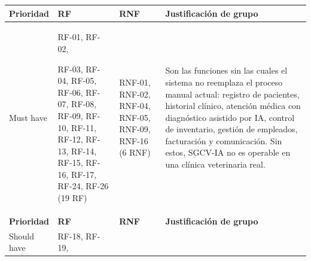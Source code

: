 \documentclass[
]{article}
\newcounter{none} %
\begin{document}
{\def\LTcaptype{none} %
\begin{longtable}[]{@{}
  >{\centering\arraybackslash}p{}
  >{\raggedright\arraybackslash}p{}
  >{\raggedright\arraybackslash}p{}
  >{\raggedright\arraybackslash}p{}@{}}
\toprule\noalign{}
\begin{minipage}[b]{\linewidth}\centering
\textbf{Prioridad}
\end{minipage} & \begin{minipage}[b]{\linewidth}\centering
\textbf{RF}
\end{minipage} & \begin{minipage}[b]{\linewidth}\centering
\textbf{RNF}
\end{minipage} & \begin{minipage}[b]{\linewidth}\centering
\textbf{Justificación de grupo}
\end{minipage} \\
\midrule\noalign{}
\endhead
\bottomrule\noalign{}
\endlastfoot
Must have & RF-01, RF-02,

RF-03, RF-04, RF-05, RF-06, RF-07, RF-08, RF-09, RF-10, RF-11, RF-12, RF-13, RF-14, RF-15, RF-16, RF-17, RF-24, RF-26 (19 RF) &
\begin{minipage}[t]{\linewidth}\raggedright
RNF-01, RNF-02, RNF-04, RNF-05, RNF-09, RNF-16 (6 RNF)
\end{minipage} & Son las funciones sin las cuales el sistema no
reemplaza el proceso manual actual: registro de pacientes, historial
clínico, atención médica con diagnóstico asistido por IA, control de
inventario, gestión de empleados, facturación y comunicación. Sin estos,
SGCV-IA no es operable en una clínica veterinaria real. \\
\textbf{Prioridad} & \textbf{RF} & \textbf{RNF} & \textbf{Justificación
de grupo} \\
Should have & RF-18, RF-19,


\end{longtable}}
\end{document}
